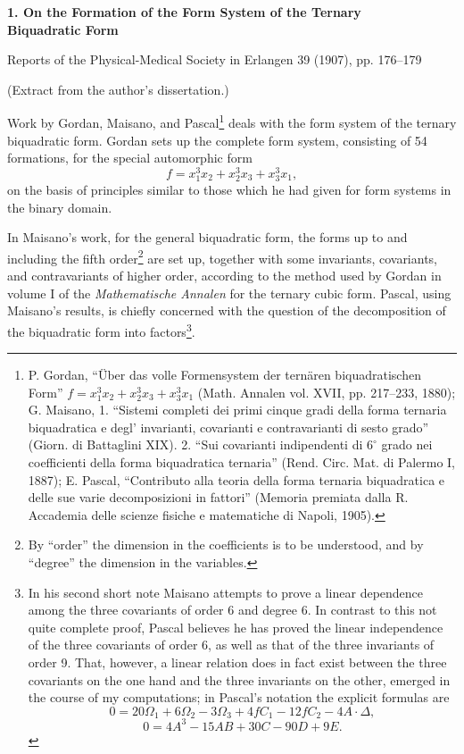 \documentclass[11pt]{article}
\begin{document}
\begin{center}
{\Large\bfseries 1. On the Formation of the Form System of the Ternary\\ Biquadratic Form}\par
\vspace{1.5em}
Reports of the Physical-Medical Society in Erlangen 39 (1907), pp. 176--179
\end{center}

\vspace{4em}
\begin{center}
(Extract from the author's dissertation.)
\end{center}

Work by Gordan, Maisano, and Pascal\footnote{P. Gordan, ``Über das volle Formensystem der ternären biquadratischen Form'' $f=x_1^3x_2+x_2^3x_3+x_3^3x_1$ (Math. Annalen vol. XVII, pp. 217--233, 1880); G. Maisano, 1. ``Sistemi completi dei primi cinque gradi della forma ternaria biquadratica e degl' invarianti, covarianti e contravarianti di sesto grado'' (Giorn. di Battaglini XIX). 2. ``Sui covarianti indipendenti di $6^\circ$ grado nei coefficienti della forma biquadratica ternaria'' (Rend. Circ. Mat. di Palermo I, 1887); E. Pascal, ``Contributo alla teoria della forma ternaria biquadratica e delle sue varie decomposizioni in fattori'' (Memoria premiata dalla R. Accademia delle scienze fisiche e matematiche di Napoli, 1905).} deals with the form system of the ternary biquadratic form. Gordan sets up the complete form system, consisting of 54 formations, for the special automorphic form
\[
f=x_1^3x_2+x_2^3x_3+x_3^3x_1,
\]
on the basis of principles similar to those which he had given for form systems in the binary domain.

In Maisano's work, for the general biquadratic form, the forms up to and including the fifth order\footnote{By ``order'' the dimension in the coefficients is to be understood, and by ``degree'' the dimension in the variables.} are set up, together with some invariants, covariants, and contravariants of higher order, according to the method used by Gordan in volume I of the \emph{Mathematische Annalen} for the ternary cubic form. Pascal, using Maisano's results, is chiefly concerned with the question of the decomposition of the biquadratic form into factors\footnote{In his second short note Maisano attempts to prove a linear dependence among the three covariants of order 6 and degree 6. In contrast to this not quite complete proof, Pascal believes he has proved the linear independence of the three covariants of order 6, as well as that of the three invariants of order 9. That, however, a linear relation does in fact exist between the three covariants on the one hand and the three invariants on the other, emerged in the course of my computations; in Pascal's notation the explicit formulas are
\[
0=20\Omega_1+6\Omega_2-3\Omega_3+4fC_1-12fC_2-4A\cdot\Delta,
\]
\[
0=4A^3-15AB+30C-90D+9E.
\]}.
\end{document}
